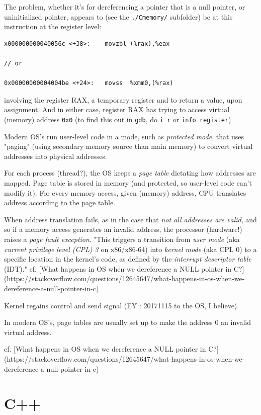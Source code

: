 \documentclass[10pt]{amsart}
\begin{document}
\begin{multicols*}{2}
  
The problem, whether it's for dereferencing a pointer that is a null pointer, or uninitialized pointer, appears to (see the \verb|./Cmemory/| subfolder) be at this instruction at the register level:  

\begin{lstlisting}
x000000000040056c <+38>:	movzbl (%rax),%eax

// or 

0x00000000004004be <+24>:	movss  %xmm0,(%rax)  
\end{lstlisting}

involving the register RAX, a temporary register and to return a value, upon assignment.  And in either case, register RAX has trying to access virtual (memory) address \verb|0x0| (to find this out in \verb|gdb|, do \verb|i r| or \verb|info register|).  

Modern OS's run user-level code in a mode, such as \emph{protected mode}, that uses "paging" (using secondary memory source than main memory) to convert virtual addresses into physical addresses.  

For each process (thread?), the OS keeps a \emph{page table} dictating how addresses are mapped.  Page table is stored in memory (and protected, so user-level code can't modify it).  For every memory access, given (memory) address, CPU translates address according to the page table.  

When address translation fails, as in the case that \emph{not all addresses are valid}, and so if a memory access generates an invalid address, the processor (hardware!) raises a \emph{page fault exception}.  "This triggers a transition from \emph{user mode} (aka \emph{current privilege level (CPL) 3} on x86/x86-64) into \emph{kernel mode} (aka CPL 0) to a specific location in the kernel's code, as defined by the \emph{interrupt descriptor table} (IDT)."  cf. [What happens in OS when we dereference a NULL pointer in C?](https://stackoverflow.com/questions/12645647/what-happens-in-os-when-we-dereference-a-null-pointer-in-c)


Kernel regains control and send signal (EY : 20171115 to the OS, I believe).   

In modern OS's, page tables are usually set up to make the address 0 an invalid virtual address.  

cf. [What happens in OS when we dereference a NULL pointer in C?](https://stackoverflow.com/questions/12645647/what-happens-in-os-when-we-dereference-a-null-pointer-in-c)

\part{C++}  


\end{multicols*}
\end{document}
